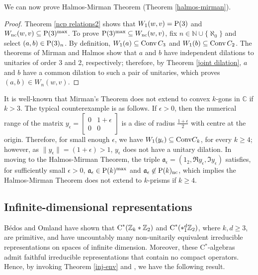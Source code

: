 \documentclass{amsart}
\theoremstyle{definition}
\theoremstyle{remark}
\newcommand\cstar{{\textrm C}^*}                              %
\numberwithin{equation}{section}
\begin{document}
We can now prove Halmos-Mirman Theorem (Theorem \ref{halmos-mirman}).

\begin{proof} Theorem \ref{ncp relations2} shows that $W_1(w,v)= \mbox{\textrm P}(3)$ and $W_{\textrm{nc}}(w,v)\subseteq \mbox{\textrm P}(3)^{\textrm{max}}$.
To prove $\mbox{\textrm P}(3)^{\textrm{max}}\subseteq W_{\textrm{nc}}(w,v)$, fix $n\in\mathbb N\cup\{\aleph_0\}$ and
select $(a,b)\in\mbox{\textrm P}(3)_n$. By definition, $W_1(a)\subseteq \mbox{\textrm Conv}\,C_3$ and $W_1(b)\subseteq\mbox{\textrm Conv}\,C_2$.
The theorems of Mirman and Halmos show that $a$ and $b$ have independent dilations to unitaries of order 3 and 2, respectively; therefore,
by Theorem \ref{joint dilation}, $a$ and $b$ have a common dilation to such a pair of unitaries, which proves $(a,b)\in W_{n}(w,v)$.
\end{proof}

It is well-known that Mirman's Theorem does not extend to convex $k$-gons in $\mathbb C$ if $k>3$. The typical counterexample is as follows.
If $\epsilon>0$, then the numerical range of the matrix $y_\epsilon=\left[\begin{array}{cc} 0& 1+\epsilon \\ 0 & 0\end{array}\right]$ is a disc of radius $\frac{1+\epsilon}{2}$ with centre at the origin.
Therefore, for small enough $\epsilon$, we have $W_1(y_\epsilon)\subseteq \mbox{\textrm Conv} C_k$, for every $k\geq 4$; however, as $\|y_\epsilon\|=(1+\epsilon)>1$, $y_\epsilon$ does not
have a unitary dilation. In moving to the Halmos-Mirman Theorem,  
the triple $\mathfrak a_\epsilon=(1_2,\Re y_\epsilon, \Im y_\epsilon)$
satisfies, for sufficiently small $\epsilon>0$, $\mathfrak a_\epsilon\in \mbox{\textrm P}(k)^{\textrm{max}}$ and $\mathfrak a_\epsilon\not\in \mbox{\textrm P}(k)_{\textrm{nc}}$,
which implies the Halmos-Mirman Theorem does not extend to $k$-prisms if $k\geq 4$.


\subsection{Infinite-dimensional representations}

B\'edos and Omland \cite{bedos_omland2011} have shown that $\cstar(\mathbb Z_k * \mathbb Z_2)$ and $\cstar(*_1^d\mathbb Z_2)$, where $k,d\geq3$,
are primitive, and have
uncountably many non-unitarily equivalent irreducible representations on spaces of infinite dimension. Moreover, these C$^*$-algebras
admit faithful irreducible representations that contain no compact operators. 
Hence, by invoking Theorem \ref{inj-env} and \cite[Corollary 3.4]{bedos_omland2011}, we have the following result.
\end{document}

